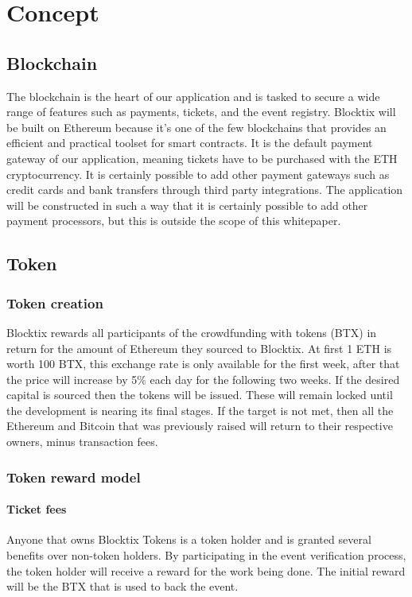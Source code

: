 \documentclass[a4paper]{article}
\begin{document}
\section{Concept}
\subsection{Blockchain}
The blockchain is the heart of our application and is tasked to secure a wide range of features such as payments, tickets, and the event registry. Blocktix will be built on Ethereum\cite{vb2013eth} because it's one of the few blockchains that provides an efficient and practical toolset for smart contracts. It is the default payment gateway of our application, meaning tickets have to be purchased with the ETH cryptocurrency. It is certainly possible to add other payment gateways such as credit cards and bank transfers through third party integrations. The application will be constructed in such a way that it is certainly possible to add other payment processors, but this is outside the scope of this whitepaper.


\subsection{Token}
\subsubsection{Token creation}
Blocktix rewards all participants of the crowdfunding with tokens (BTX) in return for the amount of Ethereum they sourced to Blocktix. At first 1 ETH is worth 100 BTX, this exchange rate is only available for the first week, after that the price will increase by 5\% each day for the following two weeks. If the desired capital is sourced then the tokens will be issued. These will remain locked until the development is nearing its final stages. If the target is not met, then all the Ethereum and Bitcoin that was previously raised will return to their respective owners, minus transaction fees.

\subsubsection{Token reward model}
\paragraph{Ticket fees}
Anyone that owns Blocktix Tokens is a token holder and is granted several benefits over non-token holders.
By participating in the event verification process, the token holder will receive a reward for the work being done. The initial reward will be the BTX that is used to back the event.
\end{document}
